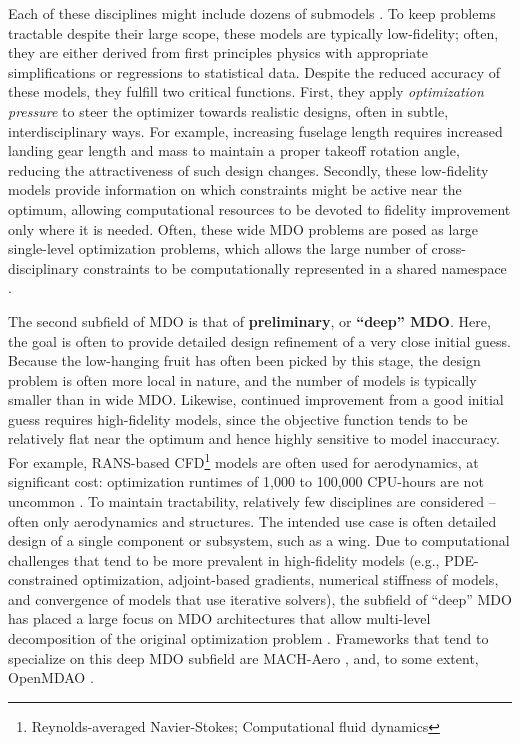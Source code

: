 \documentclass[12pt,vi,oneside,table]{report}
\begin{document}
    Each of these disciplines might include dozens of submodels \cite{cruz_weight_1989, torenbeek_synthesis_1976, torenbeek_advanced_2013, drela_tasopt_2010}. To keep problems tractable despite their large scope, these models are typically low-fidelity; often, they are either derived from first principles physics with appropriate simplifications or regressions to statistical data. Despite the reduced accuracy of these models, they fulfill two critical functions. First, they apply \textit{optimization pressure} to steer the optimizer towards realistic designs, often in subtle, interdisciplinary ways. For example, increasing fuselage length requires increased landing gear length and mass to maintain a proper takeoff rotation angle, reducing the attractiveness of such design changes. Secondly, these low-fidelity models provide information on which constraints might be active near the optimum, allowing computational resources to be devoted to fidelity improvement only where it is needed. Often, these wide MDO problems are posed as large single-level optimization problems, which allows the large number of cross-disciplinary constraints to be computationally represented in a shared namespace \cite{hoburg_geometric_2014}.

    The second subfield of MDO is that of \textbf{preliminary}, or \textbf{``deep'' MDO}. Here, the goal is often to provide detailed design refinement of a very close initial guess. Because the low-hanging fruit has often been picked by this stage, the design problem is often more local in nature, and the number of models is typically smaller than in wide MDO. Likewise, continued improvement from a good initial guess requires high-fidelity models, since the objective function tends to be relatively flat near the optimum and hence highly sensitive to model inaccuracy. For example, RANS-based CFD\footnote{Reynolds-averaged Navier-Stokes; Computational fluid dynamics} models are often used for aerodynamics, at significant cost: optimization runtimes of 1,000 to 100,000 CPU-hours are not uncommon \cite{kenway_multipoint_2014}. To maintain tractability, relatively few disciplines are considered -- often only aerodynamics and structures. The intended use case is often detailed design of a single component or subsystem, such as a wing. Due to computational challenges that tend to be more prevalent in high-fidelity models (e.g., PDE-constrained optimization, adjoint-based gradients, numerical stiffness of models, and convergence of models that use iterative solvers), the subfield of ``deep'' MDO has placed a large focus on MDO architectures that allow multi-level decomposition of the original optimization problem \cite{martins_multidisciplinary_2013}. Frameworks that tend to specialize on this deep MDO subfield are MACH-Aero \cite{he_aerodynamic_2018}, and, to some extent, OpenMDAO \cite{gray_openmdao_2019}.
\end{document}
